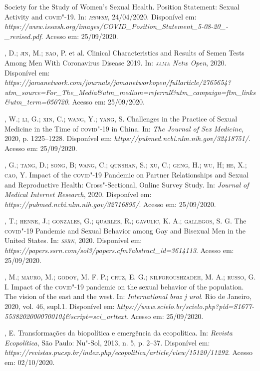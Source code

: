 \begin{bibliohedra}
 Society for the Study of Women's Sexual Health. Position
Statement: Sexual Activity and \textsc{covid}"-19. In: \emph{\textsc{isswsh}}, 24/04/2020.
Disponível em:
\emph{https://www.isswsh.org/images/COVID\_Position\_Statement\_5-08-20\_-\_revised.pdf}.
Acesso em: 25/09/2020.

, D.; \textsc{jin}, M.; \textsc{bao}, P. et al. Clinical Characteristics and Results of
Semen Tests Among Men With Coronavirus Disease 2019. In: \emph{\textsc{jama} Netw
Open}, 2020. Disponível em:
\emph{https://jamanetwork.com/journals/jamanetworkopen/fullarticle/2765654?utm\_source=For\_The\_Media\&utm\_medium=referral\&utm\_campaign=ftm\_links\&utm\_term=050720}.
Acesso em: 25/09/2020.

, W.; \textsc{li}, G.; \textsc{xin}, C.; \textsc{wang}, Y.; \textsc{yang}, S. Challenges in the Practice
of Sexual Medicine in the Time of \textsc{covid}"-19 in China. In: \emph{The
Journal of Sex Medicine}, 2020, p. 1225--1228. Disponível em:
\emph{https://pubmed.ncbi.nlm.nih.gov/32418751/}. Acesso em: 25/09/2020.

, G.; \textsc{tang}, D.; \textsc{song}, B; \textsc{wang}, C.; \textsc{qunshan}, S.; \textsc{xu}, C.; \textsc{geng}, H.; \textsc{wu},
H; \textsc{he}, X.; \textsc{cao}, Y. Impact of the \textsc{covid}"-19 Pandemic on Partner
Relationships and Sexual and Reproductive Health: Cross"-Sectional,
Online Survey Study. In: \emph{Journal of Medical Internet Research},
2020. Disponível em: \emph{https://pubmed.ncbi.nlm.nih.gov/32716895/}.
Acesso em: 25/09/2020.

, T.; \textsc{henne}, J.; \textsc{gonzales}, G.; \textsc{quarles}, R.; \textsc{gavulic}, K. A.;
\textsc{gallegos}, S. G. The \textsc{covid}"-19 Pandemic and Sexual Behavior among Gay and
Bisexual Men in the United States. In: \emph{\textsc{ssrn}}, 2020. Disponível em:
\emph{https://papers.ssrn.com/sol3/papers.cfm?abstract\_id=3614113}.
Acesso em: 25/09/2020.

, M.; \textsc{mauro}, M.; \textsc{godoy}, M. F. P.; \textsc{cruz}, E. G.; \textsc{nilforoushzadeh}, M.
A.; \textsc{russo}, G. I. Impact of the \textsc{covid}"-19 pandemic on the sexual behavior
of the population. The vision of the east and the west. In:
\emph{International braz j urol}. Rio de Janeiro, 2020, vol. 46, supl.1.
Disponível em:
\emph{https://www.scielo.br/scielo.php?pid=S1677-55382020000700104\&script=sci\_arttext}.
Acesso em: 25/09/2020.

, E. Transformações da biopolítica e emergência da ecopolítica.
In: \emph{Revista Ecopolítica}, São Paulo: Nu"-Sol, 2013, n. 5, p. 2--37.
Disponível em:
\emph{https://revistas.pucsp.br/index.php/ecopolitica/article/view/15120/11292}.
Acesso em: 02/10/2020.


\end{bibliohedra}
